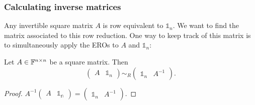 \subsubsection{Calculating inverse matrices}
Any invertible square matrix $A$ is row equivalent to $\mathbb{1}_n$. We want to find the matrix associated to this row reduction. One way to keep track of this matrix is to simultaneously apply the EROs to $A$ and $\mathbb{1}_n$:
\begin{lemma}
Let $A\in\mathbb{F}^{n\times n}$ be a square matrix. Then
\[ \left(\begin{array}{c|c} A & \mathbb{1}_n \end{array}\right) \sim_R \left(\begin{array}{c|c} \mathbb{1}_n & A^{-1} \end{array}\right). \]
\end{lemma}
\begin{proof}
$A^{-1}\begin{pmatrix}
A & \mathbb{1_n}
\end{pmatrix} = \begin{pmatrix}
\mathbb{1}_n & A^{-1}
\end{pmatrix}$.
\end{proof}


